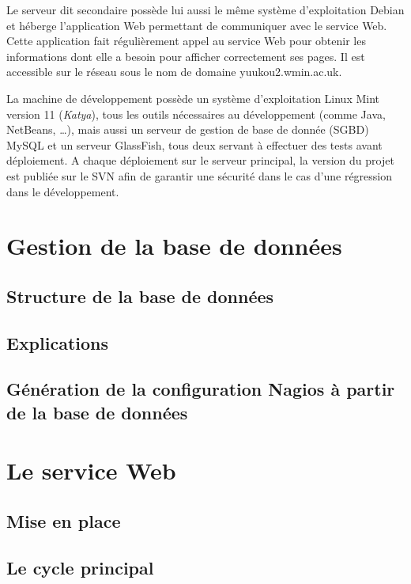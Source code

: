 Le serveur dit {\og}secondaire{\fg} poss\`ede lui aussi le m\^eme syst\`eme d'exploitation Debian et h\'eberge l'application Web permettant de communiquer avec le service Web.
Cette application fait r\'eguli\`erement appel au service Web pour obtenir les informations dont elle a besoin pour afficher correctement ses pages.
Il est accessible sur le r\'eseau sous le nom de domaine \textsf{yuukou2.wmin.ac.uk}.

La machine de d\'eveloppement poss\`ede un syst\`eme d'exploitation Linux Mint version 11 (\textit{Katya}), tous les outils n\'ecessaires au d\'eveloppement (comme Java, NetBeans, \ldots), mais aussi un serveur de gestion de base de donn\'ee (SGBD) MySQL et un serveur GlassFish, tous deux servant \`a effectuer des tests avant d\'eploiement.
A chaque d\'eploiement sur le serveur principal, la version du projet est publi\'ee sur le SVN afin de garantir une s\'ecurit\'e dans le cas d'une r\'egression dans le d\'eveloppement.


\section{Gestion de la base de donn\'ees}

\subsection{Structure de la base de donn\'ees}

\subsection{Explications}

\subsection{G\'en\'eration de la configuration Nagios \`a partir de la base de donn\'ees}

\section{Le service Web}

\subsection{Mise en place}

\subsection{Le cycle principal}
\label{section:cyclePrincipal}

